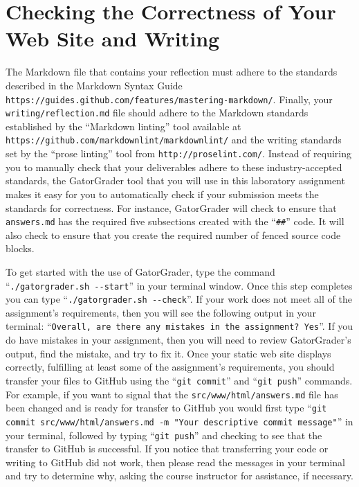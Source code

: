 \documentclass[11pt]{article}
\newcommand{\mainprogram}{\lstinline{answers.md}}
\newcommand{\mainprogramsource}{\lstinline{src/www/html/answers.md}}
\newcommand{\reflection}{\lstinline{writing/reflection.md}}
\newcommand{\gatorgraderstart}{\command{./gatorgrader.sh --start}}
\newcommand{\gatorgradercheck}{\command{./gatorgrader.sh --check}}
\newcommand{\gitcommit}{\command{git commit}}
\newcommand{\gitpush}{\command{git push}}
\newcommand{\gitcommitmainprogram}{\command{git commit src/www/html/answers.md -m "Your
descriptive commit message"}}
\newcommand{\command}[1]{``\lstinline{#1}''}
\newcommand{\url}[1]{\lstinline{#1}}
\newcommand{\step}[1]{``{#1}''}
\begin{document}
\section*{Checking the Correctness of Your Web Site and Writing}

The Markdown file that contains your reflection must adhere to the standards
described in the Markdown Syntax Guide
\url{https://guides.github.com/features/mastering-markdown/}. Finally, your
\reflection{} file should adhere to the Markdown standards established by the
\step{Markdown linting} tool available at
\url{https://github.com/markdownlint/markdownlint/} and the writing standards
set by the \step{prose linting} tool from \url{http://proselint.com/}. Instead
of requiring you to manually check that your deliverables adhere to these
industry-accepted standards, the GatorGrader tool that you will use in this
laboratory assignment makes it easy for you to automatically check if your
submission meets the standards for correctness. For instance, GatorGrader will
check to ensure that \mainprogram{} has the required five subsections created
with the \command{##} code. It will also check to ensure that you create the
required number of fenced source code blocks.

To get started with the use of GatorGrader, type the command \gatorgraderstart{}
in your terminal window. Once this step completes you can type
\gatorgradercheck{}. If your work does not meet all of the assignment's
requirements, then you will see the following output in your terminal:
\command{Overall, are there any mistakes in the assignment? Yes}. If you do have
mistakes in your assignment, then you will need to review GatorGrader's output,
find the mistake, and try to fix it. Once your static web site displays
correctly, fulfilling at least some of the assignment's requirements, you should
transfer your files to GitHub using the \gitcommit{} and \gitpush{} commands.
For example, if you want to signal that the \mainprogramsource{} file has been
changed and is ready for transfer to GitHub you would first type
\gitcommitmainprogram{} in your terminal, followed by typing \gitpush{} and
checking to see that the transfer to GitHub is successful. If you notice that
transferring your code or writing to GitHub did not work, then please read the
messages in your terminal and try to determine why, asking the course instructor
for assistance, if necessary.
\end{document}
